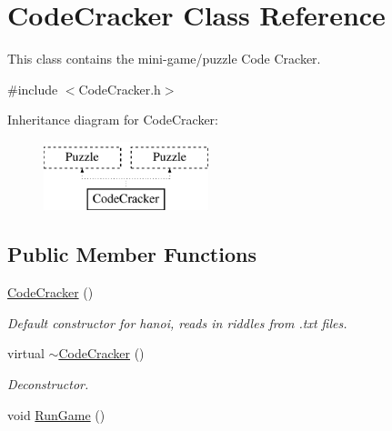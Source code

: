 \hypertarget{classCodeCracker}{\section{Code\-Cracker Class Reference}
\label{classCodeCracker}
}


This class contains the mini-\/game/puzzle Code Cracker.  




{\ttfamily \#include $<$Code\-Cracker.\-h$>$}

Inheritance diagram for Code\-Cracker\-:\begin{figure}[H]
\begin{center}
\leavevmode
\includegraphics[height=2.000000cm]{classCodeCracker}
\end{center}
\end{figure}
\subsection*{Public Member Functions}
\begin{DoxyCompactItemize}
\item 
\hyperlink{classCodeCracker_a46b5ec438efd38104b9a406b45c8cd68}{Code\-Cracker} ()
\begin{DoxyCompactList}\small\item\em Default constructor for hanoi, reads in riddles from .txt files. \end{DoxyCompactList}\item 
virtual \hyperlink{classCodeCracker_ae7dc389e166286ca2271625154dde39c}{$\sim$\-Code\-Cracker} ()
\begin{DoxyCompactList}\small\item\em Deconstructor. \end{DoxyCompactList}\item 
void \hyperlink{classCodeCracker_a4f2aaaf60b31cf33cc0d70622665be45}{Run\-Game} ()
\end{DoxyCompactItemize}
